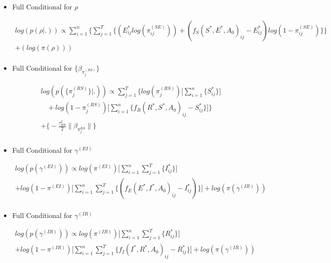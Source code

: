 \documentclass[12pt]{article}
\begin{document}
\begin{itemize}
    \item{Full Conditional for $\rho$}
    \begin{center}
    \begin{multline}
        \displaystyle
        log(p(\rho|.)) \propto\sum_{i=1}^n \bigg\{ \sum_{j=1}^T\Big\{
            (E^*_{ij}log(\pi_{ij}^{(SE)})) + (f_S(S^*, E^*, A_0)_{ij} - E^*_{ij})log(1-\pi_{ij}^{(SE)})\Big\}\bigg\} \\
            + (log(\pi(\rho)))\\
    \end{multline}
    \end{center}

\item{Full Conditional for $\{\beta_{\pi_{j}^{(RS)}}\}$}
    \begin{center}
    \begin{multline}
        \displaystyle
        log(p(\{\pi_{j}^{(RS)}\}|.))\propto\sum_{j=1}^T\Big\{log(\pi_j^{(RS)})\Big[\sum_{i=1}^n\{S^*_{ij}\}\Big] \\
            \ \ \ \ + 
            log(1-\pi_j^{(RS)})\Big[\sum_{i=1}^n\{f_R(R^*, S^*, A_0)_{ij} - S^*_{ij}\}\Big]\Big\}\\ 
            + \bigg\{ -\frac{\tau^2_{RS}}{2}\|\beta_{\pi_j^{RS}}\|  \bigg\} \\ 
    \end{multline}
\end{center}

\item{Full Conditional for $\gamma^{(EI)}$} 
    \begin{center}
        \begin{multline}
            \displaystyle
            log(p(\gamma^{(EI)})) \propto log(\pi^{(EI)})\Big[\sum_{i=1}^n\sum_{j=1}^T\{I^*_{ij}\}\Big]  
            \\+ log(1-\pi^{(EI)})\Big[\sum_{i=1}^n\sum_{j=1}^T\{(f_E(E^*, I^*, A_0)_{ij} - I^*_{ij})\}\Big] + log(\pi(\gamma^{(IR)}))\\
        \end{multline}
    \end{center}
\item{Full Conditional for $\gamma^{(IR)}$} 
    \begin{center}
        \begin{multline}
            \displaystyle
            log(p(\gamma^{(IR)})) \propto log(\pi^{(IR)})\Big[\sum_{i=1}^n\sum_{j=1}^T\{R^*_{ij}\}\Big] \\ + 
            log(1-\pi^{(IR)})\Big[\sum_{i=1}^n\sum_{j=1}^T\{ f_I(I^*, R^*, A_0)_{ij} - R^*_{ij}\} \Big] + log(\pi(\gamma^{(IR)}))\\
        \end{multline}
    \end{center}




\end{itemize}
\end{document}

